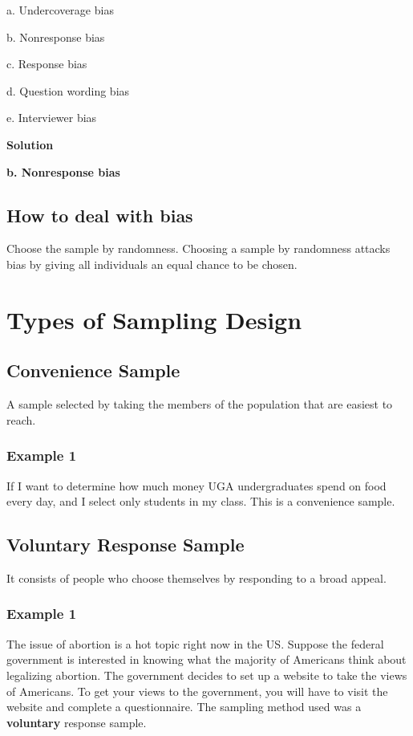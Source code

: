 a. Undercoverage bias

b. Nonresponse bias

c. Response bias

d. Question wording bias

e. Interviewer bias

\vspace{0.2cm}

\noindent \textbf{Solution}

\vspace{0.2cm}

\textbf{b. Nonresponse bias}

\subsection{How to deal with bias}
Choose the sample by randomness. Choosing a sample by randomness attacks bias by giving all individuals an equal chance to be chosen.


\section{Types of Sampling Design}

\subsection{Convenience Sample}
A sample selected by taking the members of the population that are easiest to reach. 

\subsubsection*{Example 1}
If I want to determine how much money UGA undergraduates spend on food every day, and I select only students in my class. This is a convenience sample.

\subsection{Voluntary Response Sample}
It consists of people who choose themselves by responding to a broad appeal. 

\subsubsection*{Example 1}
The issue of abortion is a hot topic right now in the US. Suppose the federal government is interested in knowing what the majority of Americans think about legalizing abortion. The government decides to set up a website to take the views of Americans. To get your views to the government, you will have to visit the website and complete a questionnaire. The sampling method used was a \textbf{voluntary} response sample.

